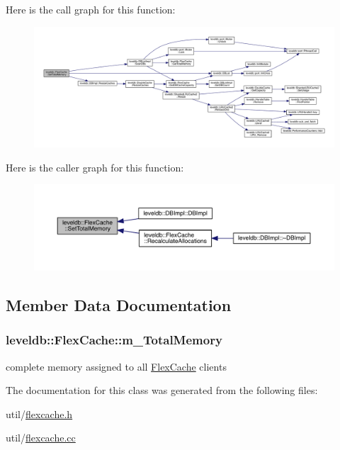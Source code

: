 Here is the call graph for this function\+:
\nopagebreak
\begin{figure}[H]
\begin{center}
\leavevmode
\includegraphics[width=350pt]{classleveldb_1_1_flex_cache_a4863498e73e13779c6dc5fadb519b067_cgraph}
\end{center}
\end{figure}




Here is the caller graph for this function\+:\nopagebreak
\begin{figure}[H]
\begin{center}
\leavevmode
\includegraphics[width=350pt]{classleveldb_1_1_flex_cache_a4863498e73e13779c6dc5fadb519b067_icgraph}
\end{center}
\end{figure}




\subsection{Member Data Documentation}
\hypertarget{classleveldb_1_1_flex_cache_a991245a40de629f6e0061a34e0c1dd84}{}
\subsubsection[{m\+\_\+\+Total\+Memory}]{ leveldb\+::\+Flex\+Cache\+::m\+\_\+\+Total\+Memory\hspace{0.3cm}{\ttfamily [protected]}}\label{classleveldb_1_1_flex_cache_a991245a40de629f6e0061a34e0c1dd84}


complete memory assigned to all \hyperlink{classleveldb_1_1_flex_cache}{Flex\+Cache} clients 



The documentation for this class was generated from the following files\+:\begin{DoxyCompactItemize}
\item 
util/\hyperlink{flexcache_8h}{flexcache.\+h}\item 
util/\hyperlink{flexcache_8cc}{flexcache.\+cc}\end{DoxyCompactItemize}
